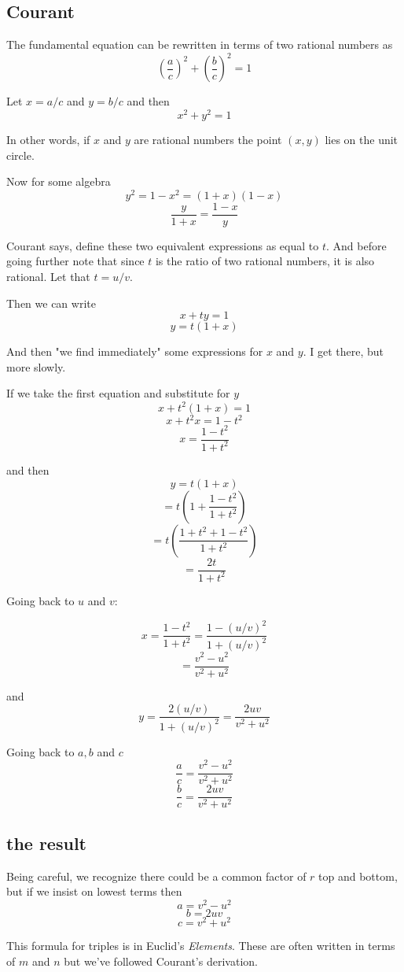 \documentclass[11pt, oneside]{article}
\begin{document}
\subsection*{Courant}

The fundamental equation can be rewritten in terms of two rational numbers as
\[ (\frac{a}{c})^2 + (\frac{b}{c})^2 = 1 \]

Let $x = a/c$ and $y = b/c$ and then
\[ x^2 + y^2 = 1 \]

In other words, if $x$ and $y$ are rational numbers the point $(x,y)$ lies on the unit circle.

Now for some algebra
\[ y^2 = 1 - x^2 = (1 + x)(1 - x) \]
\[ \frac{y}{1 + x} = \frac{1 - x}{y} \]

Courant says, define these two equivalent expressions as equal to $t$.  And before going further note that since $t$ is the ratio of two rational numbers, it is also rational.  Let that $t = u/v$.

Then we can write
\[ x + ty = 1 \]
\[ y = t(1 + x) \]

And then "we find immediately" some expressions for $x$ and $y$.  I get there, but more slowly.

If we take the first equation and substitute for $y$
\[ x + t^2(1+x) = 1 \]
\[ x + t^2x = 1 - t^2 \]
\[ x = \frac{1 - t^2}{1 + t^2 } \]

and then 
\[ y = t(1 + x) \]
\[ = t(1 + \frac{1 - t^2}{1 + t^2 }) \]
\[ = t(\frac{1 + t^2 + 1 - t^2}{1 + t^2 }) \]
\[ = \frac{2t}{1 + t^2} \]

Going back to $u$ and $v$:

\[ x = \frac{1 - t^2}{1 + t^2} = \frac{1 - (u/v)^2}{1 + (u/v)^2} \]
\[ = \frac{v^2 - u^2}{v^2 + u^2} \]

and
\[ y = \frac{2(u/v)}{1 + (u/v)^2} = \frac{2uv}{v^2 + u^2} \]

Going back to $a,b$ and $c$
\[ \frac{a}{c} = \frac{v^2 - u^2}{v^2 + u^2} \]
\[ \frac{b}{c} =  \frac{2uv}{v^2 + u^2} \]

\subsection*{the result}

Being careful, we recognize there could be a common factor of $r$ top and bottom, but if we insist on lowest terms then
\[ a = v^2 - u^2 \]
\[ b = 2uv \]
\[ c = v^2 + u^2 \]

This formula for triples is in Euclid's \emph{Elements}.  These are often written in terms of $m$ and $n$ but we've followed Courant's derivation.
\end{document}
